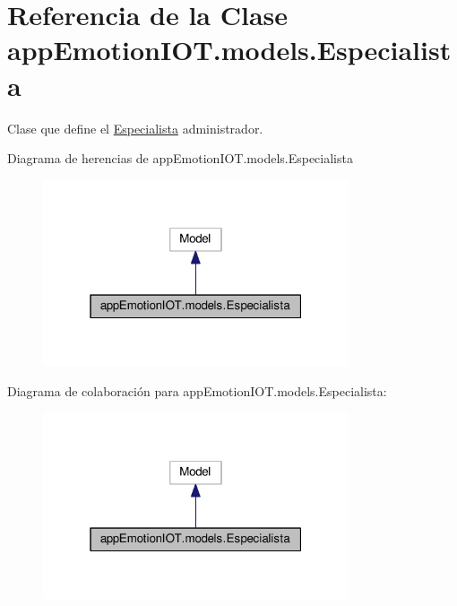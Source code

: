 \hypertarget{classappEmotionIOT_1_1models_1_1Especialista}{}\section{Referencia de la Clase app\+Emotion\+I\+O\+T.\+models.\+Especialista}
\label{classappEmotionIOT_1_1models_1_1Especialista}


Clase que define el \hyperlink{classappEmotionIOT_1_1models_1_1Especialista}{Especialista} administrador.  




Diagrama de herencias de app\+Emotion\+I\+O\+T.\+models.\+Especialista
\nopagebreak
\begin{figure}[H]
\begin{center}
\leavevmode
\includegraphics[width=256pt]{classappEmotionIOT_1_1models_1_1Especialista__inherit__graph}
\end{center}
\end{figure}


Diagrama de colaboración para app\+Emotion\+I\+O\+T.\+models.\+Especialista\+:
\nopagebreak
\begin{figure}[H]
\begin{center}
\leavevmode
\includegraphics[width=256pt]{classappEmotionIOT_1_1models_1_1Especialista__coll__graph}
\end{center}
\end{figure}
